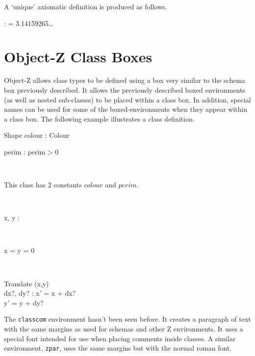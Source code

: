 \documentclass[a4paper]{article}
\begin{document}
A `unique' axiomatic definition is produced as follows.

\begin{example}
\begin{uniqdef}
\pi : \real
\ST
\pi = 3.14159265\ldots
\end{uniqdef}
\end{example}

\section{Object-Z Class Boxes}

Object-Z allows class types to be defined using a box very similar to
the schema box previously described.  It allows the previously
described boxed environments (as well as nested sub-classes) to be
placed within a class box.  In addition, special names can be used for
some of the boxed-environments when they appear within a class box.
The following example illustrates a class definition.

\begin{example}
\begin{class}{Shape}
\also
colour : Colour \\
\begin{axdef}
perim : \real
\ST
perim > 0
\end{axdef} \\
\begin{classcom}
This class has 2 constants
$colour$ and $perim$.
\end{classcom} \\
\begin{state}
x, y : \real
\end{state} \\
\begin{init}
x = y = 0
\end{init} \\
\begin{op}{Translate}
\Delta (x,y) \\
dx?, dy? : \real
\ST
x' = x + dx? \\
y' = y + dy?
\end{op}
\end{class}
\end{example}

The \verb|classcom| environment hasn't been seen before.
It creates a paragraph of text with the same margins as used
for schemas and other Z environments.  It uses a special font
intended for use when placing comments inside classes.
A similar environment, \verb|zpar|, uses the same margins
but with the normal roman font.
\end{document}

